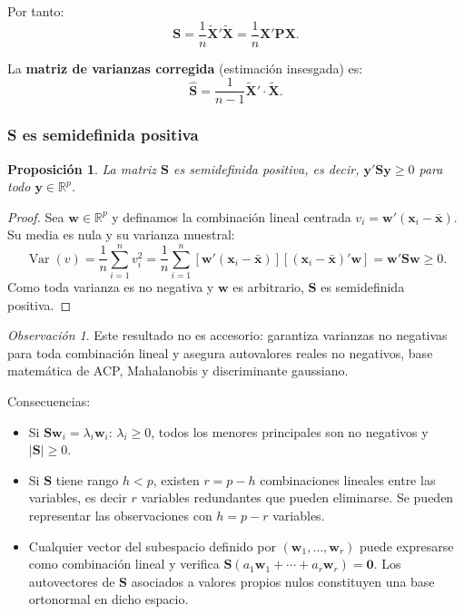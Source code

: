 \documentclass[12pt, a4paper]{article}
\theoremstyle{plain}
\newtheorem{proposicion}[teorema]{Proposición}
\theoremstyle{definition}
\theoremstyle{remark}
\newtheorem*{observacion}{Observación}
\newcommand{\R}{\mathbb{R}}
\newcommand{\mat}[1]{\mathbf{#1}}
\newcommand{\Var}{\operatorname{Var}}
\begin{document}
Por tanto:
\[
  \mat{S} = \frac{1}{n}\tilde{\mathbf{X}}'\tilde{\mathbf{X}}
  = \frac{1}{n}\mat{X}'\mat{P}\mat{X}.
\]

La \textbf{matriz de varianzas corregida} (estimación insesgada) es:
\[
  \hat{\mat{S}} = \frac{1}{n-1}\tilde{\mathbf{X}}'\cdot\tilde{\mathbf{X}}.
\]

\subsubsection{S es semidefinida positiva}

\begin{proposicion}
La matriz $\mat{S}$ es semidefinida positiva, es decir,
$\mathbf{y}'\mat{S}\mathbf{y}\ge0$ para todo $\mathbf{y}\in\R^p$.
\end{proposicion}

\begin{proof}
Sea $\mathbf{w}\in\R^p$ y definamos la combinación lineal centrada
$v_i=\mathbf{w}'(\mathbf{x}_i-\bar{\mathbf{x}})$. Su media es nula y su
varianza muestral:
\[
  \Var(v) = \frac{1}{n}\sum_{i=1}^n v_i^2
  = \frac{1}{n}\sum_{i=1}^n [\mathbf{w}'(\mathbf{x}_i-\bar{\mathbf{x}})]
    [(\mathbf{x}_i-\bar{\mathbf{x}})'\mathbf{w}] = \mathbf{w}'\mat{S}\mathbf{w} \ge 0.
\]
Como toda varianza es no negativa y $\mathbf{w}$ es arbitrario,
$\mat{S}$ es semidefinida positiva.
\end{proof}

\begin{observacion}
Este resultado no es accesorio: garantiza varianzas no negativas para toda
combinación lineal y asegura autovalores reales no negativos, base matemática
de ACP, Mahalanobis y discriminante gaussiano.
\end{observacion}

Consecuencias:
\begin{itemize}
  \item Si $\mat{S}\mathbf{w}_i = \lambda_i\mathbf{w}_i$: $\lambda_i\ge0$,
        todos los menores principales son no negativos y $|\mat{S}|\ge0$.
  \item Si $\mat{S}$ tiene rango $h<p$, existen $r=p-h$ combinaciones lineales
        entre las variables, es decir $r$ variables redundantes que pueden
        eliminarse. Se pueden representar las observaciones con $h=p-r$ variables.
  \item Cualquier vector del subespacio definido por $(\mathbf{w}_1,\dots,\mathbf{w}_r)$
        puede expresarse como combinación lineal y verifica
        $\mat{S}(a_1\mathbf{w}_1+\cdots+a_r\mathbf{w}_r)=\mathbf{0}$.
        Los autovectores de $\mat{S}$ asociados a valores propios nulos
        constituyen una base ortonormal en dicho espacio.
\end{itemize}
\end{document}
